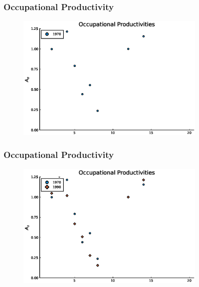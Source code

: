 \documentclass[11pt]{beamer}
\begin{document}
\begin{frame}
\frametitle{Occupational Productivity}
\label{aggprod}
\begin{figure}
\begin{center}
\includegraphics[width=0.8\textwidth]{A_men_70.eps}
\label{ }
\end{center}
\end{figure}
\end{frame}

\begin{frame}
\frametitle{Occupational Productivity}
\begin{figure}
\begin{center}
\includegraphics[width=0.8\textwidth]{A_men_70_90.eps}
\label{ }
\end{center}
\end{figure}
\end{frame}
\end{document}
